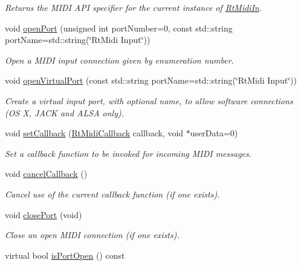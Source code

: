 \begin{DoxyCompactItemize}
\begin{DoxyCompactList}\small\item\em Returns the M\+I\+DI A\+PI specifier for the current instance of \hyperlink{class_rt_midi_in}{Rt\+Midi\+In}. \end{DoxyCompactList}\item 
void \hyperlink{class_rt_midi_in_a39df8f81a22f729a9904707dde487d2c}{open\+Port} (unsigned int port\+Number=0, const std\+::string port\+Name=std\+::string(\char`\"{}Rt\+Midi Input\char`\"{}))
\begin{DoxyCompactList}\small\item\em Open a M\+I\+DI input connection given by enumeration number. \end{DoxyCompactList}\item 
void \hyperlink{class_rt_midi_in_a245261b3f12ce727faed18fcfeef18c2}{open\+Virtual\+Port} (const std\+::string port\+Name=std\+::string(\char`\"{}Rt\+Midi Input\char`\"{}))
\begin{DoxyCompactList}\small\item\em Create a virtual input port, with optional name, to allow software connections (OS X, J\+A\+CK and A\+L\+SA only). \end{DoxyCompactList}\item 
void \hyperlink{class_rt_midi_in_a7590563461c7467608a4b3806406b32d}{set\+Callback} (\hyperlink{class_rt_midi_in_aac5c0da1ec6f97fe43d5189bad00caef}{Rt\+Midi\+Callback} callback, void $\ast$user\+Data=0)
\begin{DoxyCompactList}\small\item\em Set a callback function to be invoked for incoming M\+I\+DI messages. \end{DoxyCompactList}\item 
void \hyperlink{class_rt_midi_in_ade23832a66c1ed56965c26325602543e}{cancel\+Callback} ()
\begin{DoxyCompactList}\small\item\em Cancel use of the current callback function (if one exists). \end{DoxyCompactList}\item 
void \hyperlink{class_rt_midi_in_a55bacf0d228fd8e3be6a79d12fd1dc39}{close\+Port} (void)\hypertarget{class_rt_midi_in_a55bacf0d228fd8e3be6a79d12fd1dc39}{}\label{class_rt_midi_in_a55bacf0d228fd8e3be6a79d12fd1dc39}

\begin{DoxyCompactList}\small\item\em Close an open M\+I\+DI connection (if one exists). \end{DoxyCompactList}\item 
virtual bool \hyperlink{class_rt_midi_in_abc3f1204c9a8b3adc31cda4820c1935c}{is\+Port\+Open} () const \hypertarget{class_rt_midi_in_abc3f1204c9a8b3adc31cda4820c1935c}{}\label{class_rt_midi_in_abc3f1204c9a8b3adc31cda4820c1935c}


\end{DoxyCompactItemize}
